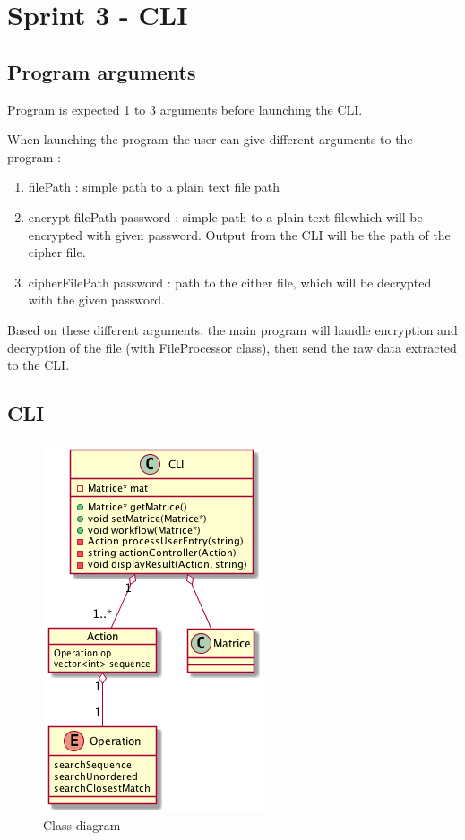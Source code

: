 \chapter{Sprint 3 - CLI}

\section{Program arguments}
\par
Program is expected 1 to 3 arguments before launching the CLI.
\par
When launching the program the user can give different arguments to the program :
\begin{enumerate}
    \item filePath : simple path to a plain text file path
    \item encrypt filePath password : simple path to a plain text filewhich will be encrypted
    with given password. Output from the CLI will be the path of the cipher file.
    \item cipherFilePath password : path to the cither file, which will be decrypted with the given password.
\end{enumerate}

Based on these different arguments, the main program will handle encryption and decryption
of the file (with FileProcessor class), then send the raw data extracted to the CLI.

\section{CLI}

\begin{figure}[h]
    \begin{center}
        \includegraphics[scale=0.40]{./ressources/graph/CLI.png}
    \end{center}
    \caption{Class diagram}
    \label{Solution - CLI class diagram}
\end{figure}
\bigskip

